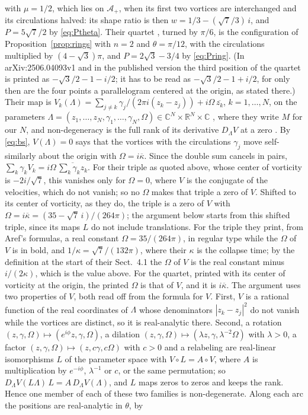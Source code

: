 \documentclass[11pt]{article}
\theoremstyle{definition}
\newcommand{\C}{\mathbb{C}}
\newcommand{\Ap}{\mathcal{A}_+}
\begin{document}
with $\mu = 1/2$, which lies on $\Ap$, when its first two vortices are interchanged and its circulations halved: its shape ratio is then $w = 1/3 - (\sqrt{7}/3)\,i$, and $P = 5\sqrt{7}/2$ by \eqref{eq:Ptheta}. Their quartet \cite[Eq.~(4.6)]{cww2026}, turned by $\pi/6$, is the configuration of Proposition~\ref{prop:rings} with $n = 2$ and $\theta = \pi/12$, with the circulations multiplied by $(4 - \sqrt{3})\pi$, and $P = 2\sqrt{3} - 3/4$ by \eqref{eq:Pring}. (In arXiv:2506.04093v1 and in the published version the third position of the quartet is printed as $-\sqrt{3}/2 - 1 - i/2$; it has to be read as $-\sqrt{3}/2 - 1 + i/2$, for only then are the four points a parallelogram centered at the origin, as stated there.) Their map is $V_k(\Lambda) = \sum_{j \ne k} \gamma_j/(2\pi i(z_k - z_j)) + i\Omega\,\overline{z_k}$, $k = 1, \dots, N$, on the parameters $\Lambda = (z_1, \dots, z_N, \gamma_1, \dots, \gamma_N, \Omega) \in \C^N \times \mathbb{R}^N \times \C$ \cite[Eq.~(4.4)]{cww2026}, where they write $M$ for our $N$, and non-degeneracy is the full rank of its derivative $D_\Lambda V$ at a zero \cite[Definition~4.1]{cww2026}. By \eqref{eq:bs}, $V(\Lambda) = 0$ says that the vortices with the circulations $\gamma_j$ move self-similarly about the origin with $\Omega = i\overline{\kappa}$. Since the double sum cancels in pairs, $\sum_k \gamma_k V_k = i\Omega\,\overline{\sum_k \gamma_k z_k}$. For their triple as quoted above, whose center of vorticity is $-2i/\sqrt{7}$, this vanishes only for $\Omega = 0$, where $V$ is the conjugate of the velocities, which do not vanish; so no $\Omega$ makes that triple a zero of $V$. Shifted to its center of vorticity, as they do, the triple is a zero of $V$ with $\Omega = i\overline{\kappa} = (35 - \sqrt{7}\,i)/(264\pi)$; the argument below starts from this shifted triple, since its maps $L$ do not include translations. For the triple they print, from Aref's formulas, a real constant $\Omega = 35/(264\pi)$, in regular type while the $\Omega$ of $V$ is in bold, and $1/\kappa = \sqrt{7}/(132\pi)$, where their $\kappa$ is the collapse time; by the definition at the start of their Sect.~4.1 the $\Omega$ of $V$ is the real constant minus $i/(2\kappa)$, which is the value above. For the quartet, printed with its center of vorticity at the origin, the printed $\Omega$ is that of $V$, and it is $i\overline{\kappa}$. The argument uses two properties of $V$, both read off from the formula for $V$. First, $V$ is a rational function of the real coordinates of $\Lambda$ whose denominators $|z_k - z_j|^2$ do not vanish while the vortices are distinct, so it is real-analytic there. Second, a rotation $(z, \gamma, \Omega) \mapsto (e^{i\phi}z, \gamma, \Omega)$, a dilation $(z, \gamma, \Omega) \mapsto (\lambda z, \gamma, \lambda^{-2}\Omega)$ with $\lambda > 0$, a factor $(z, \gamma, \Omega) \mapsto (z, c\gamma, c\Omega)$ with $c > 0$ and a relabeling are real-linear isomorphisms $L$ of the parameter space with $V \circ L = A \circ V$, where $A$ is multiplication by $e^{-i\phi}$, $\lambda^{-1}$ or $c$, or the same permutation; so $D_\Lambda V(L\Lambda)\,L = A\,D_\Lambda V(\Lambda)$, and $L$ maps zeros to zeros and keeps the rank. Hence one member of each of these two families is non-degenerate. Along each arc the positions are real-analytic in $\theta$, by 
\end{document}
